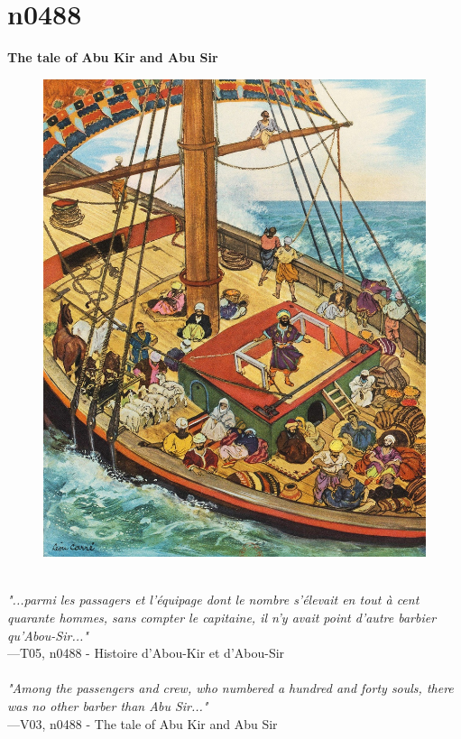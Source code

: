 \documentclass[../Carre_nights.tex]{subfiles}
\begin{document}
\section{n0488}
\textbf{\Large{The tale of Abu Kir and Abu Sir}} \\

\begin{figure}[ht]
\centering
\includegraphics[height=\figsize]{illustrations/volume_5/T05, n0488 - Histoire d'Abou-Kir et d'Abou-Sir.jpg}
\end{figure}

\textit{\\
"...parmi les passagers et l’équipage dont le nombre s’élevait en tout à cent quarante hommes, sans compter le capitaine, il n’y avait point d’autre barbier qu’Abou-Sir..."} \\
—T05, n0488 - Histoire d'Abou-Kir et d'Abou-Sir \\~\\
\textit{"Among the passengers and crew, who numbered a hundred and forty souls, there was no other barber than Abu Sir..."} \\
—V03, n0488 - The tale of Abu Kir and Abu Sir
\end{document}
